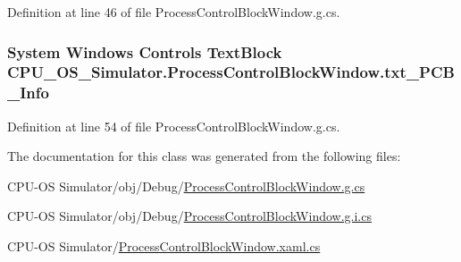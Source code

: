 Definition at line 46 of file Process\+Control\+Block\+Window.\+g.\+cs.

\hypertarget{class_c_p_u___o_s___simulator_1_1_process_control_block_window_af88f289c3eba55631106b52e491fa137}{}
\subsubsection[{txt\+\_\+\+P\+C\+B\+\_\+\+Info}]{\setlength{\rightskip}{0pt plus 5cm}System Windows Controls Text\+Block C\+P\+U\+\_\+\+O\+S\+\_\+\+Simulator.\+Process\+Control\+Block\+Window.\+txt\+\_\+\+P\+C\+B\+\_\+\+Info\hspace{0.3cm}{\ttfamily [package]}}\label{class_c_p_u___o_s___simulator_1_1_process_control_block_window_af88f289c3eba55631106b52e491fa137}


Definition at line 54 of file Process\+Control\+Block\+Window.\+g.\+cs.



The documentation for this class was generated from the following files\+:\begin{DoxyCompactItemize}
\item 
C\+P\+U-\/\+O\+S Simulator/obj/\+Debug/\hyperlink{_debug_2_process_control_block_window_8g_8cs}{Process\+Control\+Block\+Window.\+g.\+cs}\item 
C\+P\+U-\/\+O\+S Simulator/obj/\+Debug/\hyperlink{_debug_2_process_control_block_window_8g_8i_8cs}{Process\+Control\+Block\+Window.\+g.\+i.\+cs}\item 
C\+P\+U-\/\+O\+S Simulator/\hyperlink{_process_control_block_window_8xaml_8cs}{Process\+Control\+Block\+Window.\+xaml.\+cs}\end{DoxyCompactItemize}
